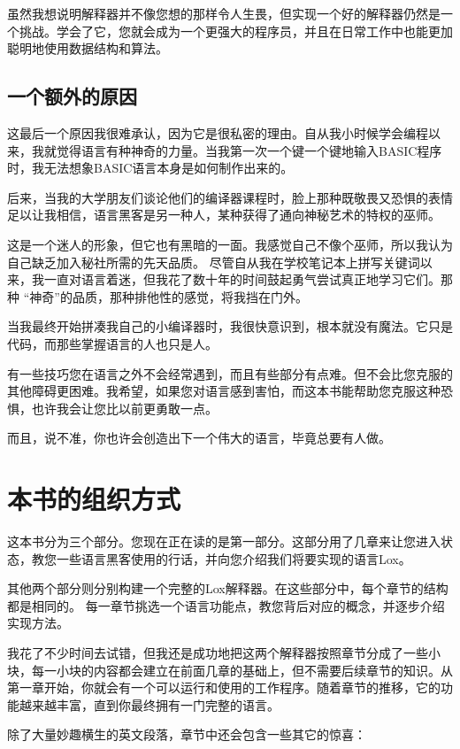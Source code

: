 \documentclass[cn,11pt,chinese]{elegantbook}
\begin{document}
虽然我想说明解释器并不像您想的那样令人生畏，但实现一个好的解释器仍然是一个挑战。学会了它，您就会成为一个更强大的程序员，并且在日常工作中也能更加聪明地使用数据结构和算法。

\subsection{一个额外的原因}

这最后一个原因我很难承认，因为它是很私密的理由。自从我小时候学会编程以来，我就觉得语言有种神奇的力量。当我第一次一个键一个键地输入BASIC程序时，我无法想象BASIC语言本身是如何制作出来的。

后来，当我的大学朋友们谈论他们的编译器课程时，脸上那种既敬畏又恐惧的表情足以让我相信，语言黑客是另一种人，某种获得了通向神秘艺术的特权的巫师。

这是一个迷人的形象，但它也有黑暗的一面。我感觉自己不像个巫师，所以我认为自己缺乏加入秘社所需的先天品质。 尽管自从我在学校笔记本上拼写关键词以来，我一直对语言着迷，但我花了数十年的时间鼓起勇气尝试真正地学习它们。那种 “神奇”的品质，那种排他性的感觉，将我挡在门外。

当我最终开始拼凑我自己的小编译器时，我很快意识到，根本就没有魔法。它只是代码，而那些掌握语言的人也只是人。

有一些技巧您在语言之外不会经常遇到，而且有些部分有点难。但不会比您克服的其他障碍更困难。我希望，如果您对语言感到害怕，而这本书能帮助您克服这种恐惧，也许我会让您比以前更勇敢一点。

而且，说不准，你也许会创造出下一个伟大的语言，毕竟总要有人做。

\section{本书的组织方式}

这本书分为三个部分。您现在正在读的是第一部分。这部分用了几章来让您进入状态，教您一些语言黑客使用的行话，并向您介绍我们将要实现的语言Lox。

其他两个部分则分别构建一个完整的Lox解释器。在这些部分中，每个章节的结构都是相同的。 每一章节挑选一个语言功能点，教您背后对应的概念，并逐步介绍实现方法。

我花了不少时间去试错，但我还是成功地把这两个解释器按照章节分成了一些小块，每一小块的内容都会建立在前面几章的基础上，但不需要后续章节的知识。从第一章开始，你就会有一个可以运行和使用的工作程序。随着章节的推移，它的功能越来越丰富，直到你最终拥有一门完整的语言。

除了大量妙趣横生的英文段落，章节中还会包含一些其它的惊喜：
\end{document}
